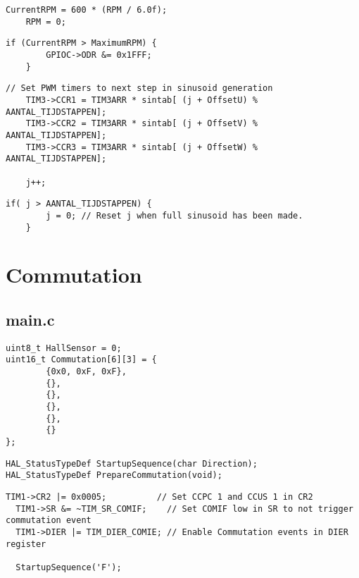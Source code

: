 \begin{lstlisting}[caption={Calculate RPM and reset counter},label={lst:Registers}]
	CurrentRPM = 600 * (RPM / 6.0f);
	RPM = 0;
\end{lstlisting}

\begin{lstlisting}[caption={Disable Gate Drivers if RPM is too high},label={lst:Registers}]
	if (CurrentRPM > MaximumRPM) {
		GPIOC->ODR &= 0x1FFF;
	}
\end{lstlisting}

\begin{lstlisting}[caption={Write some registers},label={lst:Registers}]
// Set PWM timers to next step in sinusoid generation
	TIM3->CCR1 = TIM3ARR * sintab[ (j + OffsetU) % AANTAL_TIJDSTAPPEN];
	TIM3->CCR2 = TIM3ARR * sintab[ (j + OffsetV) % AANTAL_TIJDSTAPPEN];
	TIM3->CCR3 = TIM3ARR * sintab[ (j + OffsetW) % AANTAL_TIJDSTAPPEN];

	j++;
\end{lstlisting}

\begin{lstlisting}[caption={Write some registers},label={lst:Registers}]
	if( j > AANTAL_TIJDSTAPPEN) {
		j = 0; // Reset j when full sinusoid has been made.
	}
\end{lstlisting}

\section{Commutation}
\subsection{main.c}
\begin{lstlisting}[caption={Write some registers},label={lst:Registers}]
uint8_t HallSensor = 0;
uint16_t Commutation[6][3] = {
		{0x0, 0xF, 0xF},
		{},
		{},
		{},
		{},
		{}
};
\end{lstlisting}

\begin{lstlisting}[caption={Write some registers},label={lst:Registers}]
HAL_StatusTypeDef StartupSequence(char Direction);
HAL_StatusTypeDef PrepareCommutation(void);
\end{lstlisting}

\begin{lstlisting}[caption={Write some registers},label={lst:Registers}]
  TIM1->CR2 |= 0x0005; 			// Set CCPC 1 and CCUS 1 in CR2
  TIM1->SR &= ~TIM_SR_COMIF; 	// Set COMIF low in SR to not trigger commutation event
  TIM1->DIER |= TIM_DIER_COMIE; // Enable Commutation events in DIER register

  StartupSequence('F');
\end{lstlisting}

